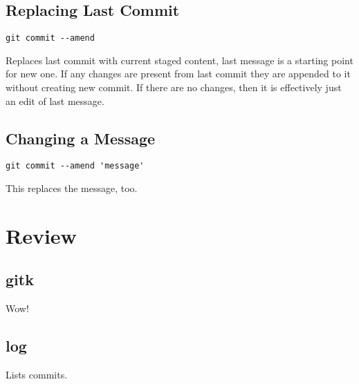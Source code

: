 \documentclass{report}
\begin{document}
\subsection{Replacing Last Commit}
\begin{verbatim}
git commit --amend
\end{verbatim}
Replaces last commit with current staged content, last message is a starting point for new one. If any changes are present from 
last commit they are appended to it without creating new commit. If there are no changes, then it is effectively just an edit of last message.

\subsection{Changing a Message}
\begin{verbatim}
git commit --amend 'message'
\end{verbatim}
This replaces the message, too.


\section{Review}

\subsection{gitk}
Wow!

\subsection{log}
Lists commits.
\end{document}
